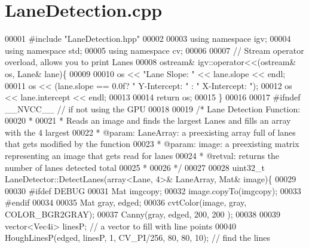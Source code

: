 \hypertarget{LaneDetection_8cpp_source}{}\section{Lane\+Detection.\+cpp}
\label{LaneDetection_8cpp_source}

\begin{DoxyCode}
00001 \textcolor{preprocessor}{#}\textcolor{preprocessor}{include} \textcolor{preprocessor}{"LaneDetection.hpp"}
00002 
00003 \textcolor{keyword}{using} \textcolor{keyword}{namespace} igv;
00004 \textcolor{keyword}{using} \textcolor{keyword}{namespace} std;
00005 \textcolor{keyword}{using} \textcolor{keyword}{namespace} cv;
00006 
00007 \textcolor{comment}{// Stream operator overload, allows you to print Lanes}
00008 ostream& igv::operator<<(ostream& os, Lane& lane)\{
00009 
00010     os << \textcolor{stringliteral}{"Lane Slope: "} << lane.slope << endl;
00011     os << (lane.slope == 0.0f? \textcolor{stringliteral}{" Y-Intercept: "} : \textcolor{stringliteral}{" X-Intercept: "});
00012     os << lane.intercept << endl;
00013 
00014     \textcolor{keywordflow}{return} os;
00015 \}
00016 
00017 \textcolor{preprocessor}{#}\textcolor{preprocessor}{ifndef} \textcolor{preprocessor}{\_\_NVCC\_\_}   \textcolor{comment}{// if not using the GPU}
00018 
00019 \textcolor{comment}{/* Lane Detection Function:}
00020 \textcolor{comment}{ * }
00021 \textcolor{comment}{ * Reads an image and finds the largest Lanes and fills an array with the 4 largest}
00022 \textcolor{comment}{ * @param: LaneArray: a preexisting array full of lanes that gets modified by the function}
00023 \textcolor{comment}{ * @param: image: a preexisting matrix representing an image that gets read for lanes}
00024 \textcolor{comment}{ * @retval: returns the number of lanes detected total}
00025 \textcolor{comment}{ * }
00026 \textcolor{comment}{ */}
00027 
00028 uint32\_t LaneDetector::DetectLanes(array<Lane, 4>& LaneArray, Mat& image)\{
00029 
00030     \textcolor{preprocessor}{#}\textcolor{preprocessor}{ifdef} \textcolor{preprocessor}{DEBUG}
00031     Mat imgcopy;
00032     image.copyTo(imgcopy);
00033     \textcolor{preprocessor}{#}\textcolor{preprocessor}{endif}
00034 
00035     Mat gray, edged;
00036     cvtColor(image, gray, COLOR\_BGR2GRAY);
00037     Canny(gray, edged, 200, 200 );
00038 
00039     vector<Vec4i> linesP;  \textcolor{comment}{// a vector to fill with line points}
00040     HoughLinesP(edged, linesP, 1, CV\_PI/256, 80, 80, 10);  \textcolor{comment}{// find the lines}

\end{DoxyCode}
